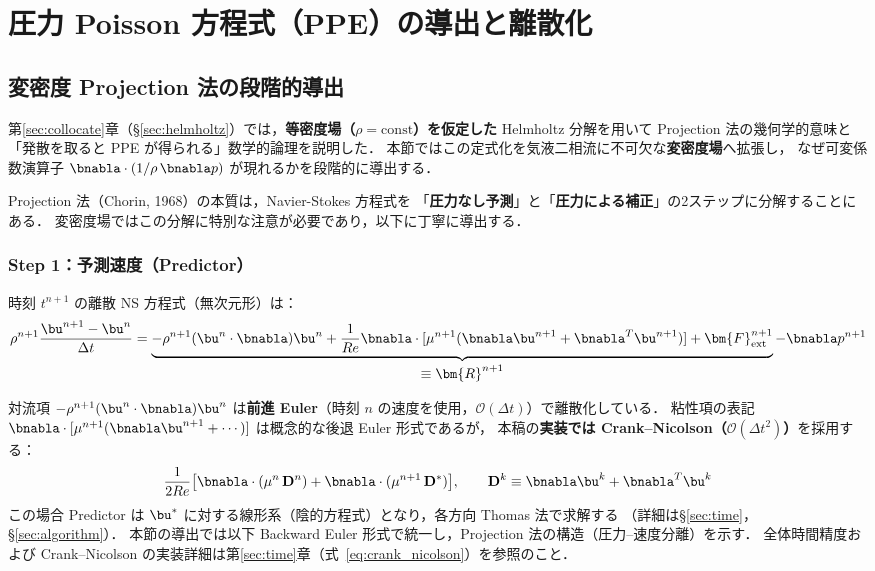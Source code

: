 \section{圧力 Poisson 方程式（PPE）の導出と離散化}
\label{sec:pressure}

\subsection{変密度 Projection 法の段階的導出}
\label{sec:projection_derivation}

第\ref{sec:collocate}章（§\ref{sec:helmholtz}）では，\textbf{等密度場（$\rho = \mathrm{const}$）を仮定した}
Helmholtz 分解を用いて Projection 法の幾何学的意味と「発散を取ると PPE が得られる」数学的論理を説明した．
本節ではこの定式化を気液二相流に不可欠な\textbf{変密度場}へ拡張し，
なぜ可変係数演算子 $\bnabla\cdot(1/\rho\,\bnabla p)$ が現れるかを段階的に導出する．

Projection 法（Chorin, 1968）の本質は，Navier-Stokes 方程式を
「\textbf{圧力なし予測}」と「\textbf{圧力による補正}」の2ステップに分解することにある．
変密度場ではこの分解に特別な注意が必要であり，以下に丁寧に導出する．

\subsubsection{Step 1：予測速度（Predictor）}

時刻 $t^{n+1}$ の離散 NS 方程式（無次元形）は：
\begin{equation}
  \rho^{n+1}\frac{\bu^{n+1} - \bu^n}{\Delta t}
  = \underbrace{-\rho^{n+1}(\bu^n\cdot\bnabla)\bu^n
    + \frac{1}{Re}\bnabla\cdot[\mu^{n+1}(\bnabla\bu^{n+1}+\bnabla^T\bu^{n+1})]
    + \bm{F}_\text{ext}^{n+1}}_{\displaystyle \equiv \bm{R}^{n+1}}
  - \bnabla p^{n+1}
  \label{eq:NS_full}
\end{equation}

\begin{tcolorbox}[mybox, title={式~\eqref{eq:NS_full} の時間離散化に関する注意}]
対流項 $-\rho^{n+1}(\bu^n\cdot\bnabla)\bu^n$ は\textbf{前進 Euler}（時刻 $n$ の速度を使用，$\mathcal{O}(\Delta t)$）で離散化している．
粘性項の表記 $\bnabla\cdot[\mu^{n+1}(\bnabla\bu^{n+1}+\cdots)]$ は概念的な後退 Euler 形式であるが，
本稿の\textbf{実装では Crank--Nicolson（$\mathcal{O}(\Delta t^2)$）}を採用する：
\[
  \frac{1}{2Re}\bigl[\bnabla\cdot(\mu^n\,\mathbf{D}^n) + \bnabla\cdot(\mu^{n+1}\,\mathbf{D}^*)\bigr],
  \qquad \mathbf{D}^k \equiv \bnabla\bu^k + \bnabla^T\bu^k
\]
この場合 Predictor は $\bu^*$ に対する線形系（陰的方程式）となり，各方向 Thomas 法で求解する
（詳細は§\ref{sec:time}，§\ref{sec:algorithm}）．
本節の導出では以下 Backward Euler 形式で統一し，Projection 法の構造（圧力--速度分離）を示す．
全体時間精度および Crank--Nicolson の実装詳細は第\ref{sec:time}章（式~\eqref{eq:crank_nicolson}）を参照のこと．
\end{tcolorbox}

